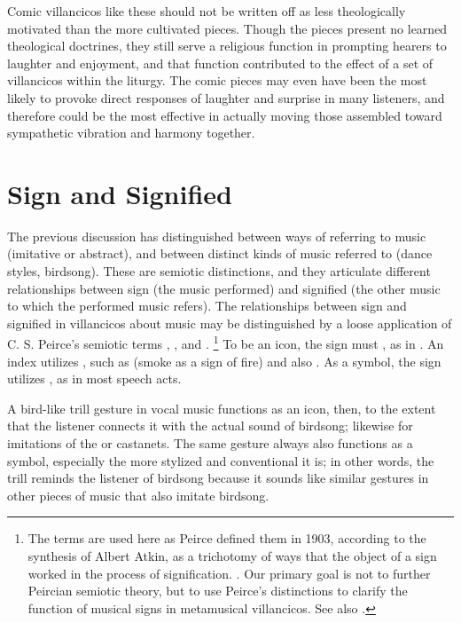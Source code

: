 Comic villancicos like these should not be written off as less theologically motivated than the more cultivated pieces.
Though the  pieces present no learned theological doctrines, they still serve a religious function in prompting hearers to laughter and enjoyment, and that function contributed to the effect of a set of villancicos within the liturgy.
The comic pieces may even have been the most likely to provoke direct responses of laughter and surprise in many listeners, and therefore could be the most effective in actually moving those assembled toward sympathetic vibration and harmony together. 

\section{%
Sign and Signified 
}

The previous discussion has distinguished between ways of referring to music (imitative or abstract), and between distinct kinds of music referred to (dance styles, birdsong).
These are semiotic distinctions, and they articulate different relationships between sign (the music performed) and signified (the other music to which the performed music refers).
The relationships between sign and signified in villancicos about music may be distinguished by a loose application of C. S. Peirce's semiotic terms , , and .%
	\footnote{%
The terms are used here as Peirce defined them in 1903, according to the synthesis of Albert Atkin, as a trichotomy of ways that the object of a sign worked in the process of signification.
\autocite{Atkin:Peirce}.
Our primary goal is not to further Peircian semiotic theory, but to use Peirce's distinctions to clarify the function of musical signs in metamusical villancicos.
See also \autocite{Turino:Signs}.
	}
To be an icon, the sign must , as in .
An index utilizes , such as  (smoke as a sign of fire) and also .
As a symbol, the sign utilizes , as in most speech acts.%
	\autocite[§3.2]{Atkin:Peirce}

A bird-like trill gesture in vocal music functions as an icon, then, to the extent that the listener connects it with the actual sound of birdsong; likewise for imitations of the  or castanets. 
The same gesture always also functions as a symbol, especially the more stylized and conventional it is; in other words, the trill reminds the listener of birdsong because it sounds like similar gestures in other pieces of music that also imitate birdsong.


